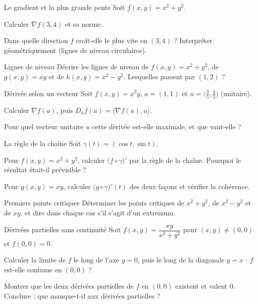 \begin{exercice}[1]{Le gradient et la plus grande pente}
Soit $f(x,y)=x^{2}+y^{2}$.
\begin{questions}
  \item Calculer $\nabla f(3,4)$ et sa norme.
  \item Dans quelle direction $f$ croît-elle le plus vite en $(3,4)$ ?
    Interpréter géométriquement (lignes de niveau circulaires).
\end{questions}
\end{exercice}

\begin{exercice}[1]{Lignes de niveau}
Décrire les lignes de niveau de $f(x,y)=x^{2}+y^{2}$, de
$g(x,y)=xy$ et de $h(x,y)=x^{2}-y^{2}$. Lesquelles passent par $(1,2)$ ?
\end{exercice}

\begin{exercice}[1]{Dérivée selon un vecteur}
Soit $f(x,y)=x^{2}y$, $a=(1,1)$ et $u=\bigl(\tfrac35,\tfrac45\bigr)$
(unitaire).
\begin{questions}
  \item Calculer $\nabla f(a)$, puis $D_uf(a)=\langle\nabla f(a),u\rangle$.
  \item Pour quel vecteur unitaire $u$ cette dérivée est-elle maximale,
    et que vaut-elle ?
\end{questions}
\end{exercice}

\begin{exercice}[1]{La règle de la chaîne}
Soit $\gamma(t)=(\cos t,\sin t)$.
\begin{questions}
  \item Pour $f(x,y)=x^{2}+y^{2}$, calculer
    $\bigl(f\circ\gamma\bigr)'$ par la règle de la chaîne. Pourquoi le
    résultat était-il prévisible ?
  \item Pour $g(x,y)=xy$, calculer $\bigl(g\circ\gamma\bigr)'(t)$ des
    deux façons et vérifier la cohérence.
\end{questions}
\end{exercice}

\begin{exercice}[1]{Premiers points critiques}
Déterminer les points critiques de $x^{2}+y^{2}$, de $x^{2}-y^{2}$ et de
$xy$, et dire dans chaque cas s'il s'agit d'un extremum.
\end{exercice}


\begin{exercice}[2]{Dérivées partielles sans continuité}
Soit $f(x,y)=\dfrac{xy}{x^{2}+y^{2}}$ pour $(x,y)\neq(0,0)$ et
$f(0,0)=0$.
\begin{questions}
  \item Calculer la limite de $f$ le long de l'axe $y=0$, puis le long de
    la diagonale $y=x$ : $f$ est-elle continue en $(0,0)$ ?
  \item Montrer que les deux dérivées partielles de $f$ en $(0,0)$
    existent et valent $0$. Conclure : que manque-t-il aux dérivées
    partielles ?
\end{questions}
\end{exercice}

